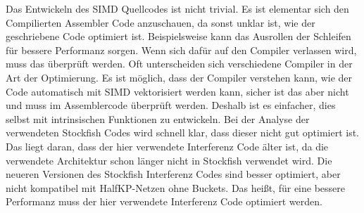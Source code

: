 Das Entwickeln des \ac{SIMD} Quellcodes ist nicht trivial. Es ist elementar sich den Compilierten Assembler Code anzuschauen, da sonst unklar ist, wie der geschriebene Code optimiert ist. Beispielsweise kann das Ausrollen der Schleifen für bessere Performanz sorgen. Wenn sich dafür auf den Compiler verlassen wird, muss das überprüft werden. Oft unterscheiden sich verschiedene Compiler in der Art der Optimierung. Es ist möglich, dass der Compiler verstehen kann, wie der Code automatisch mit \ac{SIMD} vektorisiert werden kann, sicher ist das aber nicht und muss im Assemblercode überprüft werden. Deshalb ist es einfacher, dies selbst mit intrinsischen Funktionen zu entwickeln. Bei der Analyse der verwendeten Stockfish Codes wird schnell klar, dass dieser nicht gut optimiert ist. Das liegt daran, dass der hier verwendete Interferenz Code älter ist, da die verwendete Architektur schon länger nicht in Stockfish verwendet wird. Die neueren Versionen des Stockfish Interferenz Codes sind besser optimiert, aber nicht kompatibel mit HalfKP-Netzen ohne Buckets. Das heißt, für eine bessere Performanz muss der hier verwendete Interferenz Code optimiert werden.